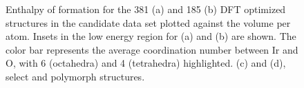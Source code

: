 \begin{figure}[!htb]
\centering
{}
\caption{\label{fig:E_vs_V}
Enthalpy of formation for the \num{381} \IrOtwo (a) and \num{185} \IrOthree (b) DFT optimized structures in the candidate data set plotted against the volume per atom.
%
Insets in the low energy region for (a) and (b) are shown.
%
The color bar represents the average coordination number between Ir and O, with 6 (octahedra) and 4 (tetrahedra) highlighted.
%
(c) and (d), select \IrOtwo and \IrOthree polymorph structures.
}
\end{figure}
